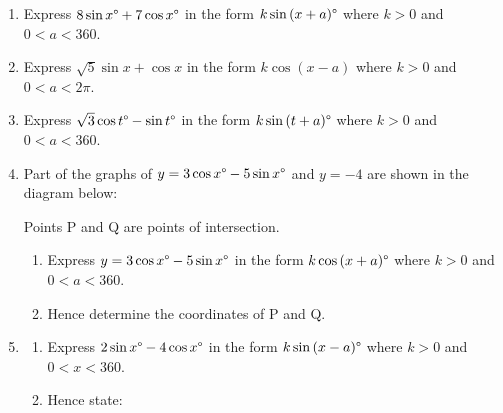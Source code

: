 \documentclass[
  11pt,
  openany]{book}
\begin{document}
\begin{enumerate}
    \item Express $8\sin{x}\degree+7\cos{x}\degree$ in the form $k\sin{(x+a)}\degree$ where $k>0$ and $0<a<360$. \faCalculator\\[0.5em]
    \item Express $\sqrt{5}\sin{x}+\cos{x}$ in the form $k\cos{(x-a)}$ where $k>0$ and $0<a<2\pi$. \faCalculator\\[0.5em]
    \item Express $\sqrt{3}\cos{t}\degree-\sin{t}\degree$ in the form $k\sin{(t+a)}\degree$ where $k>0$ and $0<a<360$.\\[0.5em]
    \item Part of the graphs of $y=3\cos{x}\degree-5\sin{x}\degree$ and $y=-4$ are shown in the diagram below: \faCalculator
    \begin{center}
    \end{center}
    Points P and Q are points of intersection.
    \begin{enumerate}
        \item Express $y=3\cos{x}\degree-5\sin{x}\degree$ in the form $k\cos{(x+a)}\degree$ where $k>0$ and $0<a<360$.
        \item Hence determine the coordinates of P and Q.\\[0.5em]
    \end{enumerate}
    \item 
    \begin{enumerate}
        \item Express $2\sin{x}\degree-4\cos{x}\degree$ in the form $k\sin{(x-a)}\degree$ where $k>0$ and $0<x<360$. \faCalculator
        \item Hence state:
        \begin{enumerate}

\end{enumerate}
\end{enumerate}
\end{enumerate}
\end{document}
